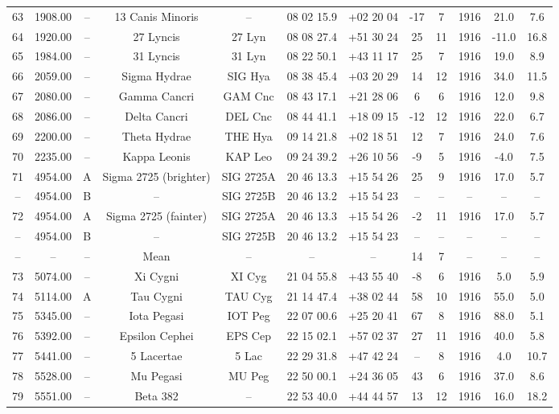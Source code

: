 \begin{table}
\begin{tabular}{cccccccccccc}
63 & 1908.00 & -- & 13 Canis Minoris & -- & 08 02 15.9 & +02 20 04 & -17 & 7 & 1916 & 21.0 & 7.6 \\
64 & 1920.00 & -- & 27 Lyncis & 27 Lyn & 08 08 27.4 & +51 30 24 & 25 & 11 & 1916 & -11.0 & 16.8 \\
65 & 1984.00 & -- & 31 Lyncis & 31 Lyn & 08 22 50.1 & +43 11 17 & 25 & 7 & 1916 & 19.0 & 8.9 \\
66 & 2059.00 & -- & Sigma Hydrae & SIG Hya & 08 38 45.4 & +03 20 29 & 14 & 12 & 1916 & 34.0 & 11.5 \\
67 & 2080.00 & -- & Gamma Cancri & GAM Cnc & 08 43 17.1 & +21 28 06 & 6 & 6 & 1916 & 12.0 & 9.8 \\
68 & 2086.00 & -- & Delta Cancri & DEL Cnc & 08 44 41.1 & +18 09 15 & -12 & 12 & 1916 & 22.0 & 6.7 \\
69 & 2200.00 & -- & Theta Hydrae & THE Hya & 09 14 21.8 & +02 18 51 & 12 & 7 & 1916 & 24.0 & 7.6 \\
70 & 2235.00 & -- & Kappa Leonis & KAP Leo & 09 24 39.2 & +26 10 56 & -9 & 5 & 1916 & -4.0 & 7.5 \\
71 & 4954.00 & A & Sigma 2725 (brighter) & SIG 2725A & 20 46 13.3 & +15 54 26 & 25 & 9 & 1916 & 17.0 & 5.7 \\
-- & 4954.00 & B & -- & SIG 2725B & 20 46 13.2 & +15 54 23 & -- & -- & -- & -- & -- \\
72 & 4954.00 & A & Sigma 2725 (fainter) & SIG 2725A & 20 46 13.3 & +15 54 26 & -2 & 11 & 1916 & 17.0 & 5.7 \\
-- & 4954.00 & B & -- & SIG 2725B & 20 46 13.2 & +15 54 23 & -- & -- & -- & -- & -- \\
-- & -- & -- & Mean & -- & -- & -- & 14 & 7 & -- & -- & -- \\
73 & 5074.00 & -- & Xi Cygni & XI Cyg & 21 04 55.8 & +43 55 40 & -8 & 6 & 1916 & 5.0 & 5.9 \\
74 & 5114.00 & A & Tau Cygni & TAU Cyg & 21 14 47.4 & +38 02 44 & 58 & 10 & 1916 & 55.0 & 5.0 \\
75 & 5345.00 & -- & Iota Pegasi & IOT Peg & 22 07 00.6 & +25 20 41 & 67 & 8 & 1916 & 88.0 & 5.1 \\
76 & 5392.00 & -- & Epsilon Cephei & EPS Cep & 22 15 02.1 & +57 02 37 & 27 & 11 & 1916 & 40.0 & 5.8 \\
77 & 5441.00 & -- & 5 Lacertae & 5 Lac & 22 29 31.8 & +47 42 24 & -- & 8 & 1916 & 4.0 & 10.7 \\
78 & 5528.00 & -- & Mu Pegasi & MU Peg & 22 50 00.1 & +24 36 05 & 43 & 6 & 1916 & 37.0 & 8.6 \\
79 & 5551.00 & -- & Beta 382 & -- & 22 53 40.0 & +44 44 57 & 13 & 12 & 1916 & 16.0 & 18.2 \\

\end{tabular}
\end{table}
